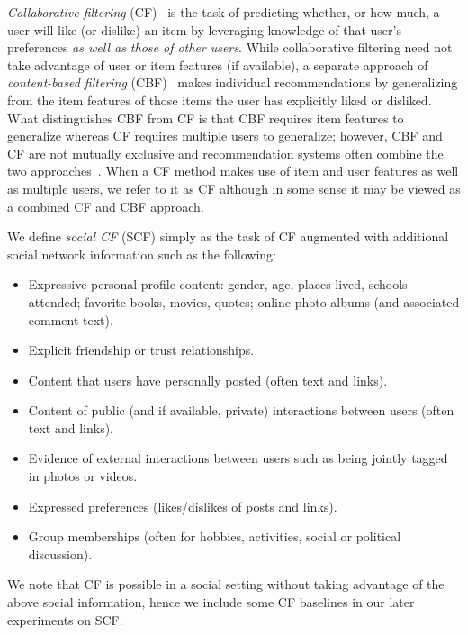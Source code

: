 \emph{Collaborative filtering} (CF)~\cite{collab_filtering} is the
task of predicting whether, or how much, a user will like (or dislike)
an item by leveraging knowledge of that user's preferences \emph{as
well as those of other users}.  While collaborative filtering need not
take advantage of user or item features (if available), a separate 
approach of \emph{content-based filtering} (CBF)~\cite{newsweeder}
makes individual recommendations by generalizing from the
item features of those items the user has
explicitly liked or disliked.
 What distinguishes
CBF from CF is that CBF requires item features to generalize whereas
CF requires multiple users to generalize; however,
CBF and CF are not mutually exclusive and recommendation systems often
combine the two approaches~\cite{fab}.   When a CF method makes use
of item and user features as well as multiple users, we refer to it as
CF although in some sense it may be viewed as a combined CF and CBF
approach.

We define \emph{social CF} (SCF) simply as the task of CF augmented
with additional social network information such as the following:
\begin{itemize}
\item Expressive personal profile content: gender, age, places lived, schools
attended; favorite books, movies, quotes; online photo albums (and associated comment text).
\item Explicit friendship or trust relationships.
\item Content that users have personally posted (often text and links).
\item Content of public (and if available, private) interactions
between users (often text and links).
\item Evidence of external interactions between users such as being 
jointly tagged in photos or videos.
\item Expressed preferences (likes/dislikes of posts and links).
\item Group memberships (often for hobbies, activities, social or political discussion).
\end{itemize}
We note that CF is possible in a social setting without taking
advantage of the above social information, hence we include some CF
baselines in our later experiments on SCF.  

